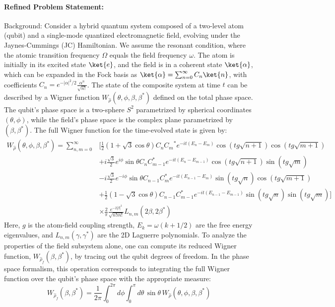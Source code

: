 \documentclass[10pt]{article}
\begin{document}
\paragraph*{Refined Problem Statement:}
Background:
Consider a hybrid quantum system composed of a two-level atom (qubit) and a single-mode quantized electromagnetic field, evolving under the Jaynes-Cummings (JC) Hamiltonian. We assume the resonant condition, where the atomic transition frequency $\Omega$ equals the field frequency $\omega$. The atom is initially in its excited state $\ket{e}$, and the field is in a coherent state $\ket{\alpha}$, which can be expanded in the Fock basis as $\ket{\alpha} = \sum_{n=0}^{\infty} C_n \ket{n}$, with coefficients $C_n = e^{- |\alpha|^2/2 } \frac{ \alpha^n }{ \sqrt{ n! } }$. The state of the composite system at time $t$ can be described by a Wigner function $W_{\hat{\rho}}(\theta, \phi, \beta, \beta^*)$ defined on the total phase space. The qubit's phase space is a two-sphere $S^2$ parametrized by spherical coordinates $(\theta, \phi)$, while the field's phase space is the complex plane parametrized by $(\beta, \beta^*)$. The full Wigner function for the time-evolved state is given by:
\begin{align*}
W_{\hat{\rho}}(\theta, \phi, \beta,\beta^{*}) = \sum_{n,m=0}^{\infty} & \Big[\frac{1}{2}(1+\sqrt{3}\cos\theta) C_n{C_m}^{*} {e^{-it(E_n-E_m)}}\cos(tg\sqrt{n+1})\cos(tg\sqrt{m+1}) \\
& +i\frac{\sqrt{3}}{2}e^{i\phi}\sin\theta C_n C_{m-1}^{*}{e^{-it(E_n-E_{m-1})}}\cos(tg\sqrt{n+1})\sin(tg\sqrt{m}) \\
& -i\frac{\sqrt{3}}{2}e^{-i\phi}\sin\theta C_{n-1}C_m^{*} {e^{-it(E_{n-1}-E_m)}}\sin(tg\sqrt{n})\cos(tg\sqrt{m+1}) \\
& +\frac{1}{2}(1-\sqrt{3}\cos\theta) C_{n-1}C_{m-1}^{*} {e^{-it(E_{n-1}-E_{m-1})}}\sin(tg\sqrt{n})\sin(tg\sqrt{m})\Big] \\
& \times \frac{2}{\pi}\frac{e^{-2|\beta|^{2}}}{\sqrt{n!m!}}L_{n,m}(2\beta,2\beta^{*})
\end{align*}
Here, $g$ is the atom-field coupling strength, $E_k = \omega(k+1/2)$ are the free energy eigenvalues, and $L_{n,m}(\gamma, \gamma^*)$ are the 2D Laguerre polynomials. To analyze the properties of the field subsystem alone, one can compute its reduced Wigner function, $W_{\hat{\rho}_f}(\beta, \beta^*)$, by tracing out the qubit degrees of freedom. In the phase space formalism, this operation corresponds to integrating the full Wigner function over the qubit's phase space with the appropriate measure:
$$W_{\hat{\rho}_{f}}(\beta,\beta^{*})=\frac{1}{2\pi}\int_{0}^{2\pi} d\phi \int_{0}^{\pi} d\theta \, \sin\theta \, W_{\hat{\rho}}(\theta,\phi,\beta,\beta^{*})$$
\end{document}
